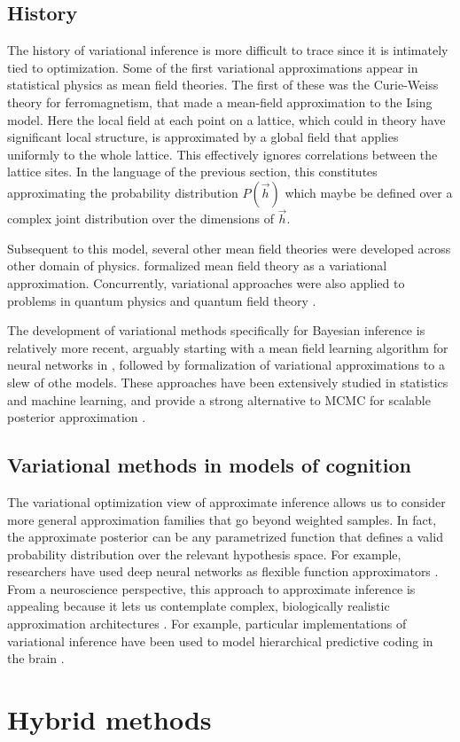 \subsection{History}

The history of variational inference is more difficult to trace since it is intimately tied to optimization. Some of the first variational approximations appear in statistical physics as mean field theories. The first of these was the Curie-Weiss theory for ferromagnetism, that made a mean-field approximation to the Ising model\cite{curie1895proprietes,  weiss1907hypothese}. Here the local field at each point on a lattice, which could in theory have significant local structure, is approximated by a global field that applies uniformly to the whole lattice. This effectively ignores correlations between the lattice sites. In the language of the previous section, this constitutes approximating the probability distribution $P(\vec{h})$ which maybe be defined over a complex joint distribution over the dimensions of $\vec{h}$. 

Subsequent to this model, several other mean field theories were developed across other domain of physics. \citet{landau1965collected} formalized mean field theory as a variational approximation\cite{kadanoff2009more}. Concurrently, variational approaches were also applied to problems in quantum physics and quantum field theory \citep{milton2006electromagnetic, feynman1965quantum}. 

The development of variational methods specifically for Bayesian inference is relatively more recent, arguably starting with a mean field learning algorithm for neural networks in \citet{anderson1987mean}, followed by formalization of variational approximations to a slew of othe models\citep{saul1996mean, jaakkola1997variational}. These approaches have been extensively studied in statistics and machine learning, and provide a strong alternative to MCMC for scalable posterior approximation \citep{blei2017variational}.

\subsection{Variational methods in models of cognition}

The variational optimization view of approximate inference allows us to consider more general approximation families that go beyond weighted samples. In fact, the approximate posterior can be any parametrized function that defines a valid probability distribution over the relevant hypothesis space. For example, researchers have used deep neural networks as flexible function approximators \citep{dayan1995helmholtz,kingma2014auto,mnih2014neural,rezende2015variational,paige2016inference}. From a neuroscience perspective, this approach to approximate inference is appealing because it lets us contemplate complex, biologically realistic approximation architectures \citep[provided that the optimization procedures can also be realized biologically; see][]{whittington2019theories}. For example, particular implementations of variational inference have been used to model hierarchical predictive coding in the brain \citep{friston2008hierarchical,gershman2019does}.


\section{Hybrid methods}

